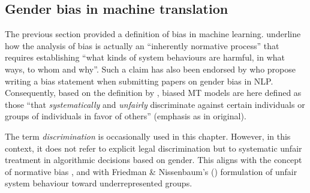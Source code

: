 \subsection{Gender bias in machine translation} \label{sub:biasMT}
The previous section provided a definition of bias in machine learning. \textcite[5454]{blodgett-etal-2020-language} underline how the analysis of bias is actually an ``inherently normative process'' that requires establishing ``what kinds of system behaviours are harmful, in what ways, to whom and why''. Such a claim has also been endorsed by \textcite{hardmeier2021write} who propose writing a bias statement when submitting papers on gender bias in NLP. Consequently, based on the definition by \textcite{Friedman1996bias}, biased MT models are here defined as those ``that \textit{systematically} and \textit{unfairly} discriminate against certain individuals or groups of individuals in favor of others'' (emphasis as in original). 

The term \textit{discrimination} is occasionally used in this chapter. However, in this context, it does not refer to explicit legal discrimination but to systematic unfair treatment in algorithmic decisions based on gender. This aligns with the concept of normative bias \citep{crawford2017keynote}, and with Friedman \& Nissenbaum’s (\cite*{Friedman1996bias}) formulation of unfair system behaviour toward underrepresented groups.

